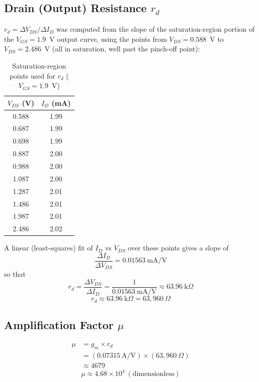 \documentclass[12pt,a4paper]{article}
\begin{document}
\subsection{Drain (Output) Resistance $r_d$}
$r_d = \Delta V_{DS}/\Delta I_D$ was computed from the slope of the saturation-region portion of the $V_{GS}=1.9$~V output curve, using the points from $V_{DS}=0.588$~V to $V_{DS}=2.486$~V (all in saturation, well past the pinch-off point):

\begin{table}[H]
\centering
\caption{Saturation-region points used for $r_d$ ($V_{GS}=1.9$~V)}
\begin{tabular}{@{}cc@{}}
\toprule
$V_{DS}$ (V) & $I_D$ (mA) \\
\midrule
0.588 & 1.99 \\
0.687 & 1.99 \\
0.698 & 1.99 \\
0.887 & 2.00 \\
0.988 & 2.00 \\
1.087 & 2.00 \\
1.287 & 2.01 \\
1.486 & 2.01 \\
1.987 & 2.01 \\
2.486 & 2.02 \\
\bottomrule
\end{tabular}
\end{table}

A linear (least-squares) fit of $I_D$ vs $V_{DS}$ over these points gives a slope of
\begin{equation}
    \frac{\Delta I_D}{\Delta V_{DS}} = 0.01563~\text{mA/V}
\end{equation}
so that
\begin{equation}
    r_d = \frac{\Delta V_{DS}}{\Delta I_D} = \frac{1}{0.01563~\text{mA/V}} \approx 63.96~\text{k}\Omega
\end{equation}
\begin{equation}
    \boxed{r_d \approx 63.96~\text{k}\Omega = 63{,}960~\Omega}
\end{equation}

\subsection{Amplification Factor $\mu$}
\begin{align}
    \mu &= g_m \times r_d \\
    &= (0.07315~\text{A/V}) \times (63{,}960~\Omega) \\
    &\approx 4679
\end{align}
\begin{equation}
    \boxed{\mu \approx 4.68 \times 10^{3} \ (\text{dimensionless})}
\end{equation}
\end{document}
